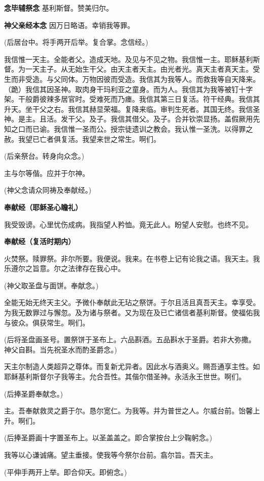 \documentclass[UTF8,17pt]{ctexart}
\begin{document}
\textbf{念毕辅祭念} \quad 基利斯督。赞美归尔。

\textbf{神⽗亲经本念} \quad 因万⽇略语。幸销我等罪。

(后居台中。将⼿两开后举。复合掌。念信经。)

我信惟⼀天主。全能者⽗。造成天地。及见与不见之物。我信惟⼀主。耶稣基利斯督。为⼀天主⼦。从⽆始⽣⼲⽗。由天主者天主。由光者光。真天主者真天主。受⽣⽽⾮受造。与⽗同体。万物因彼⽽受造。我信其为我等⼈。⽽救我等⾃天降来。（跪）我信其因圣神。取⾁⾝⼲玛利亚之童⾝。⽽为⼈。我信其为我等被钉⼗字架。⼲般爵彼辣多居官时。受难死⽽乃瘗。我信其第三⽇复活。符⼲经典。我信其升天。坐⼲⽗之右。我信其赫显荣福。复降来临。审判⽣死者。其国⽆终。我信圣神。是主。且活。发⼲⽗。及⼦。我信其借⽗。及⼦。合并钦崇显扬。盖假厥⽤先知之口⽽已谕。我信惟⼀圣⽽公。授宗徒遗训之教会。我认惟⼀圣洗。以得罪之赦。我望已亡者俱复活。我望来世之常⽣。啊们。

(后亲祭台。转⾝向众念。)

主与尔等偕。应并于尔神。

(神⽗念请众同祷及奉献经。)

\textbf{奉献经（耶稣圣⼼瞻礼）}

我受毁谤。⼼⾥忧伤成病。我指望⼈矜恤。竟⽆此⼈。盼望⼈安慰。也终不见。

\textbf{奉献经（复活时期内）}

⽕焚祭。赎罪祭。⾮尔所要。我便说。我来。在书卷上记有论我之语。我天主。我乐遵尔之旨意。尔之法律存在我⼼中。

(神⽗取圣盘与⾯饼。奉献念。)

全能⽆始⽆终天主⽗。予微仆奉献此⽆玷之祭饼。于尔且活且真吾天主。幸享受。为我⽆数罪过与懈忽。及为诸与祭者。又为现在及已亡诸信者基利斯督。使福佑我与彼众。俱获常⽣。啊们。

(后将圣盘画圣号。置祭饼于圣布上。六品斟酒。五品斟⽔于圣爵。若⾮⼤弥撒。神⽗⾃斟。当先祝圣⽔⽽酌圣爵念。)

天主尔制造⼈类超异之尊体。⽽复新尤异者。因此⽔与酒奥义。赐吾通享主性。如耶稣基利斯督尔⼦我等主。允合吾性。其偕尔借圣神。永活永王世世。啊们。

(后捧圣爵奉献念。)

主。吾奉献救灵之爵于尔。恳尔宽仁。为我等。并为普世之⼈。尔威台前。饴馨上升。啊们。

(后捧圣爵画⼗字置圣布上。以圣盖盖之。即合掌按台上少鞠躬念。)

我等以⼼谦诚痛。望主垂接。使我等今祭尔台前。翕尔旨。吾天主。

(平伸⼿两开上举。即合仰天。即俯念。)
\end{document}

